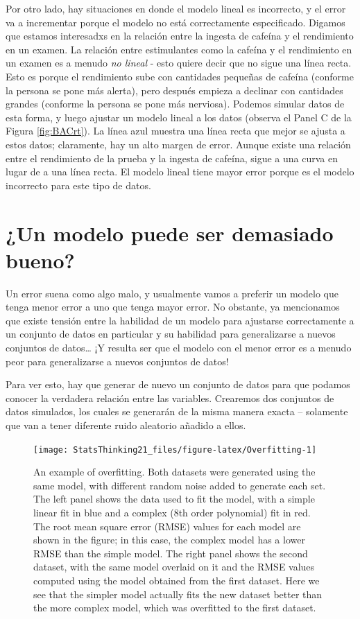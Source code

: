 \documentclass[
  12pt,
]{book}
\theoremstyle{definition}
\theoremstyle{definition}
\theoremstyle{definition}
\theoremstyle{remark}
\begin{document}
Por otro lado, hay situaciones en donde el modelo lineal es incorrecto, y el error va a incrementar porque el modelo no está correctamente especificado. Digamos que estamos interesadxs en la relación entre la ingesta de cafeína y el rendimiento en un examen. La relación entre estimulantes como la cafeína y el rendimiento en un examen es a menudo \emph{no lineal} - esto quiere decir que no sigue una línea recta. Esto es porque el rendimiento sube con cantidades pequeñas de cafeína (conforme la persona se pone más alerta), pero después empieza a declinar con cantidades grandes (conforme la persona se pone más nerviosa). Podemos simular datos de esta forma, y luego ajustar un modelo lineal a los datos (observa el Panel C de la Figura \ref{fig:BACrt}). La línea azul muestra una línea recta que mejor se ajusta a estos datos; claramente, hay un alto margen de error. Aunque existe una relación entre el rendimiento de la prueba y la ingesta de cafeína, sigue a una curva en lugar de a una línea recta. El modelo lineal tiene mayor error porque es el modelo incorrecto para este tipo de datos.

\hypertarget{un-modelo-puede-ser-demasiado-bueno}{%
\section{¿Un modelo puede ser demasiado bueno?}\label{un-modelo-puede-ser-demasiado-bueno}}

Un error suena como algo malo, y usualmente vamos a preferir un modelo que tenga menor error a uno que tenga mayor error. No obstante, ya mencionamos que existe tensión entre la habilidad de un modelo para ajustarse correctamente a un conjunto de datos en particular y su habilidad para generalizarse a nuevos conjuntos de datos\ldots{} ¡Y resulta ser que el modelo con el menor error es a menudo peor para generalizarse a nuevos conjuntos de datos!

Para ver esto, hay que generar de nuevo un conjunto de datos para que podamos conocer la verdadera relación entre las variables. Crearemos dos conjuntos de datos simulados, los cuales se generarán de la misma manera exacta -- solamente que van a tener diferente ruido aleatorio añadido a ellos.

\begin{figure}
\texttt{[image: StatsThinking21\_files/figure-latex/Overfitting-1]} \caption{An example of overfitting. Both datasets were generated using the same model, with different random noise added to generate each set.  The left panel shows the data used to fit the model, with a simple linear fit in blue and a complex (8th order polynomial) fit in red.  The root mean square error (RMSE) values for each model are shown in the figure; in this case, the complex model has a lower RMSE than the simple model.  The right panel shows the second dataset, with the same model overlaid on it and the RMSE values computed using the model obtained from the first dataset.  Here we see that the simpler model actually fits the new dataset better than the more complex model, which was overfitted to the first dataset.}\label{fig:Overfitting}
\end{figure}
\end{document}
